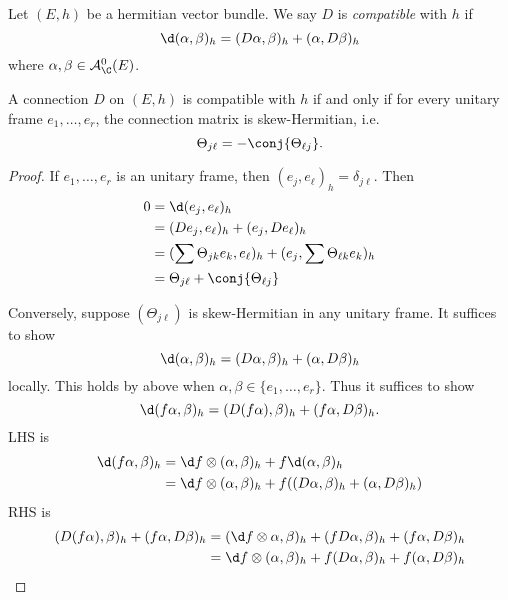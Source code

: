 \documentclass[a4paper]{article}
\begin{document}
\begin{definition}
  Let \((E, h)\) be a hermitian vector bundle. We say \(D\) is \emph{compatible} with \(h\) if
  \[
    \d(\alpha, \beta)_h = (D\alpha, \beta)_h + (\alpha, D\beta)_h
  \]
  where \(\alpha, \beta \in \mathcal A_\C^0(E)\).
\end{definition}

\begin{proposition}
  A connection \(D\) on \((E, h)\) is compatible with \(h\) if and only if for every unitary frame \(e_1, \dots, e_r\), the connection matrix is skew-Hermitian, i.e.
  \[
    \Theta_{j\ell} = - \conj{\Theta_{\ell j}}.
  \]
\end{proposition}

\begin{proof}
  If \(e_1, \dots, e_r\) is an unitary frame, then \((e_j, e_\ell)_h = \delta_{j \ell}\). Then
  \begin{align*}
    0
    &= \d (e_j, e_\ell)_h \\
    &= (De_j, e_\ell)_h + (e_j, De_\ell)_h \\
    &= (\sum \Theta_{jk} e_k, e_\ell)_h + (e_j, \sum \Theta_{\ell k} e_k)_h \\
    &= \Theta_{j\ell} + \conj{\Theta_{\ell j}}
  \end{align*}

  Conversely, suppose \((\Theta_{j\ell})\) is skew-Hermitian in any unitary frame. It suffices to show
  \[
    \d(\alpha, \beta)_h = (D\alpha, \beta)_h + (\alpha, D\beta)_h
  \]
  locally. This holds by above when \(\alpha, \beta \in \{e_1, \dots, e_r\}\). Thus it suffices to show
  \[
    \d (f \alpha, \beta)_h = (D(f\alpha), \beta)_h + (f\alpha, D\beta)_h.
  \]
  LHS is
  \begin{align*}
    \d(f\alpha, \beta)_h
    &= \d f \otimes (\alpha, \beta)_h + f \d (\alpha, \beta)_h \\
    &= \d f \otimes (\alpha, \beta)_h + f((D\alpha, \beta)_h + (\alpha, D\beta)_h)
  \end{align*}
  RHS is
  \begin{align*}
    (D(f\alpha), \beta)_h + (f\alpha, D\beta)_h
    &= (\d f \otimes \alpha, \beta)_h + (f D\alpha, \beta)_h + (f\alpha, D\beta)_h \\
    &= \d f \otimes (\alpha, \beta)_h + f(D\alpha, \beta)_h + f(\alpha, D\beta)_h
  \end{align*}
\end{proof}
\end{document}
